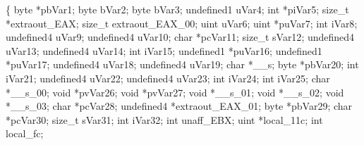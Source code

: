 \documentclass[
]{article}
\newenvironment{Shaded}{}{}
\newcommand{\DataTypeTok}[1]{\textcolor[rgb]{0.56,0.13,0.00}{#1}}
\newcommand{\NormalTok}[1]{#1}
\newcommand{\OperatorTok}[1]{\textcolor[rgb]{0.40,0.40,0.40}{#1}}
\begin{document}
\begin{Shaded}
\begin{Highlighting}[]
\OperatorTok{\{}
\NormalTok{  byte }\OperatorTok{*}\NormalTok{pbVar1}\OperatorTok{;}
\NormalTok{  byte bVar2}\OperatorTok{;}
\NormalTok{  byte bVar3}\OperatorTok{;}
\NormalTok{  undefined1 uVar4}\OperatorTok{;}
  \DataTypeTok{int} \OperatorTok{*}\NormalTok{piVar5}\OperatorTok{;}
  \DataTypeTok{size\_t} \OperatorTok{*}\NormalTok{extraout\_EAX}\OperatorTok{;}
  \DataTypeTok{size\_t}\NormalTok{ extraout\_EAX\_00}\OperatorTok{;}
\NormalTok{  uint uVar6}\OperatorTok{;}
\NormalTok{  uint }\OperatorTok{*}\NormalTok{puVar7}\OperatorTok{;}
  \DataTypeTok{int}\NormalTok{ iVar8}\OperatorTok{;}
\NormalTok{  undefined4 uVar9}\OperatorTok{;}
\NormalTok{  undefined4 uVar10}\OperatorTok{;}
  \DataTypeTok{char} \OperatorTok{*}\NormalTok{pcVar11}\OperatorTok{;}
  \DataTypeTok{size\_t}\NormalTok{ sVar12}\OperatorTok{;}
\NormalTok{  undefined4 uVar13}\OperatorTok{;}
\NormalTok{  undefined4 uVar14}\OperatorTok{;}
  \DataTypeTok{int}\NormalTok{ iVar15}\OperatorTok{;}
\NormalTok{  undefined1 }\OperatorTok{*}\NormalTok{puVar16}\OperatorTok{;}
\NormalTok{  undefined1 }\OperatorTok{*}\NormalTok{puVar17}\OperatorTok{;}
\NormalTok{  undefined4 uVar18}\OperatorTok{;}
\NormalTok{  undefined4 uVar19}\OperatorTok{;}
  \DataTypeTok{char} \OperatorTok{*}\NormalTok{\_\_s}\OperatorTok{;}
\NormalTok{  byte }\OperatorTok{*}\NormalTok{pbVar20}\OperatorTok{;}
  \DataTypeTok{int}\NormalTok{ iVar21}\OperatorTok{;}
\NormalTok{  undefined4 uVar22}\OperatorTok{;}
\NormalTok{  undefined4 uVar23}\OperatorTok{;}
  \DataTypeTok{int}\NormalTok{ iVar24}\OperatorTok{;}
  \DataTypeTok{int}\NormalTok{ iVar25}\OperatorTok{;}
  \DataTypeTok{char} \OperatorTok{*}\NormalTok{\_\_s\_00}\OperatorTok{;}
  \DataTypeTok{void} \OperatorTok{*}\NormalTok{pvVar26}\OperatorTok{;}
  \DataTypeTok{void} \OperatorTok{*}\NormalTok{pvVar27}\OperatorTok{;}
  \DataTypeTok{void} \OperatorTok{*}\NormalTok{\_\_s\_01}\OperatorTok{;}
  \DataTypeTok{void} \OperatorTok{*}\NormalTok{\_\_s\_02}\OperatorTok{;}
  \DataTypeTok{void} \OperatorTok{*}\NormalTok{\_\_s\_03}\OperatorTok{;}
  \DataTypeTok{char} \OperatorTok{*}\NormalTok{pcVar28}\OperatorTok{;}
\NormalTok{  undefined4 }\OperatorTok{*}\NormalTok{extraout\_EAX\_01}\OperatorTok{;}
\NormalTok{  byte }\OperatorTok{*}\NormalTok{pbVar29}\OperatorTok{;}
  \DataTypeTok{char} \OperatorTok{*}\NormalTok{pcVar30}\OperatorTok{;}
  \DataTypeTok{size\_t}\NormalTok{ sVar31}\OperatorTok{;}
  \DataTypeTok{int}\NormalTok{ iVar32}\OperatorTok{;}
  \DataTypeTok{int}\NormalTok{ unaff\_EBX}\OperatorTok{;}
\NormalTok{  uint }\OperatorTok{*}\NormalTok{local\_11c}\OperatorTok{;}
  \DataTypeTok{int}\NormalTok{ local\_fc}\OperatorTok{;}

\end{Highlighting}
\end{Shaded}
\end{document}
